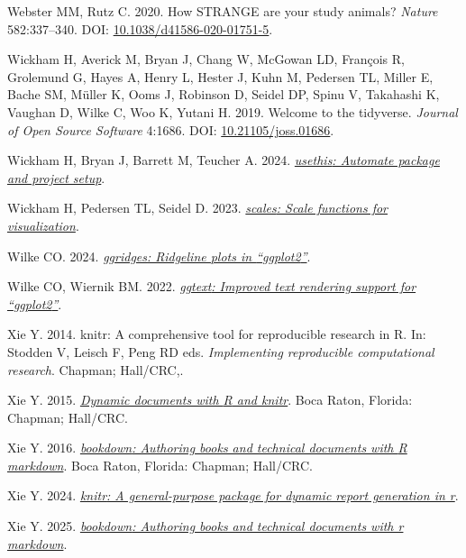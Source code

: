 \documentclass[10pt,a4paper]{article}
\newlength{\cslhangindent}
\newenvironment{CSLReferences}[2] %
 {\begin{list}{}{%
  \setlength{\itemindent}{0pt}
  \setlength{\leftmargin}{0pt}
  \setlength{\parsep}{0pt}
  \ifodd #1
   \setlength{\leftmargin}{\cslhangindent}
   \setlength{\itemindent}{-1\cslhangindent}
  \fi
  \setlength{\itemsep}{#2\baselineskip}}}
 {\end{list}}
\begin{document}
\begin{CSLReferences}{1}{0}
Webster MM, Rutz C. 2020. How {STRANGE} are your study animals? \emph{Nature} 582:337--340. DOI: \href{https://doi.org/10.1038/d41586-020-01751-5}{10.1038/d41586-020-01751-5}.

Wickham H, Averick M, Bryan J, Chang W, McGowan LD, François R, Grolemund G, Hayes A, Henry L, Hester J, Kuhn M, Pedersen TL, Miller E, Bache SM, Müller K, Ooms J, Robinson D, Seidel DP, Spinu V, Takahashi K, Vaughan D, Wilke C, Woo K, Yutani H. 2019. Welcome to the {tidyverse}. \emph{Journal of Open Source Software} 4:1686. DOI: \href{https://doi.org/10.21105/joss.01686}{10.21105/joss.01686}.

Wickham H, Bryan J, Barrett M, Teucher A. 2024. \emph{\href{https://CRAN.R-project.org/package=usethis}{{usethis}: Automate package and project setup}}.

Wickham H, Pedersen TL, Seidel D. 2023. \emph{\href{https://CRAN.R-project.org/package=scales}{{scales}: Scale functions for visualization}}.

Wilke CO. 2024. \emph{\href{https://CRAN.R-project.org/package=ggridges}{{ggridges}: Ridgeline plots in {``{ggplot2}''}}}.

Wilke CO, Wiernik BM. 2022. \emph{\href{https://CRAN.R-project.org/package=ggtext}{{ggtext}: Improved text rendering support for {``{ggplot2}''}}}.

Xie Y. 2014. {knitr}: A comprehensive tool for reproducible research in {R}. In: Stodden V, Leisch F, Peng RD eds. \emph{Implementing reproducible computational research}. Chapman; Hall/CRC,.

Xie Y. 2015. \emph{\href{https://yihui.org/knitr/}{Dynamic documents with {R} and knitr}}. Boca Raton, Florida: Chapman; Hall/CRC.

Xie Y. 2016. \emph{\href{https://bookdown.org/yihui/bookdown}{{bookdown}: Authoring books and technical documents with {R} markdown}}. Boca Raton, Florida: Chapman; Hall/CRC.

Xie Y. 2024. \emph{\href{https://yihui.org/knitr/}{{knitr}: A general-purpose package for dynamic report generation in r}}.

Xie Y. 2025. \emph{\href{https://github.com/rstudio/bookdown}{{bookdown}: Authoring books and technical documents with r markdown}}.


\end{CSLReferences}
\end{document}
